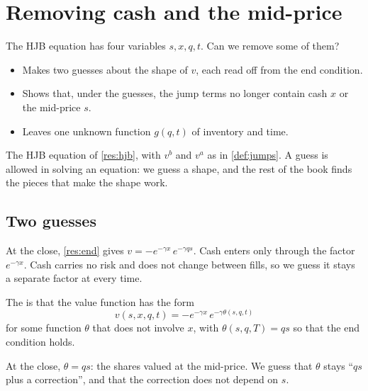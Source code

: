 \chapter{Removing cash and the mid-price}
\label{ch:guesses}

\begin{question}
The HJB equation has four variables $s,x,q,t$. Can we remove some of them?
\end{question}

\begin{whatfor}
\begin{itemize}
  \item Makes two guesses about the shape of $v$, each read off from the end condition.
  \item Shows that, under the guesses, the jump terms no longer contain cash $x$ or the mid-price $s$.
  \item Leaves one unknown function $g(q,t)$ of inventory and time.
\end{itemize}
\end{whatfor}

\begin{setup}[Setup]
The HJB equation of \cref{res:hjb}, with $v^b$ and $v^a$ as in \cref{def:jumps}. A guess is allowed in solving an equation: we guess a shape, and the rest of the book finds the pieces that make the shape work.
\end{setup}

\section{Two guesses}

At the close, \cref{res:end} gives $v=-e^{-\gamma x}\,e^{-\gamma qs}$. Cash enters only through the factor $e^{-\gamma x}$. Cash carries no risk and does not change between fills, so we guess it stays a separate factor at every time.

\begin{definition}
\label{def:guess1}
The  is that the value function has the form
\[
  v(s,x,q,t)=-e^{-\gamma x}\,e^{-\gamma\theta(s,q,t)}
\]
for some function $\theta$ that does not involve $x$, with $\theta(s,q,T)=qs$ so that the end condition holds.
\end{definition}

At the close, $\theta=qs$: the shares valued at the mid-price. We guess that $\theta$ stays ``$qs$ plus a correction'', and that the correction does not depend on $s$.

